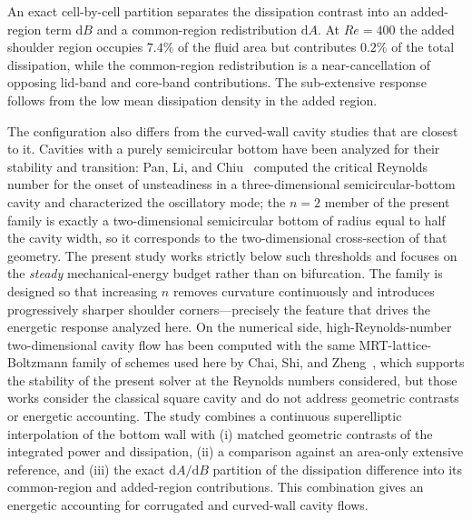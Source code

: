 An exact cell-by-cell partition separates the dissipation contrast into an added-region term $\mathrm{d}B$ and a common-region redistribution $\mathrm{d}A$. At $Re=400$ the added shoulder region occupies $7.4\%$ of the fluid area but contributes $0.2\%$ of the total dissipation, while the common-region redistribution is a near-cancellation of opposing lid-band and core-band contributions. The sub-extensive response follows from the low mean dissipation density in the added region.

The configuration also differs from the curved-wall cavity studies that are closest to it. Cavities with a purely semicircular bottom have been analyzed for their stability and transition: Pan, Li, and Chiu~\cite{Pan2025} computed the critical Reynolds number for the onset of unsteadiness in a three-dimensional semicircular-bottom cavity and characterized the oscillatory mode; the $n=2$ member of the present family is exactly a two-dimensional semicircular bottom of radius equal to half the cavity width, so it corresponds to the two-dimensional cross-section of that geometry. The present study works strictly below such thresholds and focuses on the \emph{steady} mechanical-energy budget rather than on bifurcation. The family is designed so that increasing $n$ removes curvature continuously and introduces progressively sharper shoulder corners---precisely the feature that drives the energetic response analyzed here. On the numerical side, high-Reynolds-number two-dimensional cavity flow has been computed with the same MRT-lattice-Boltzmann family of schemes used here by Chai, Shi, and Zheng~\cite{Chai2006}, which supports the stability of the present solver at the Reynolds numbers considered, but those works consider the classical square cavity and do not address geometric contrasts or energetic accounting. The study combines a continuous superelliptic interpolation of the bottom wall with (i) matched geometric contrasts of the integrated power and dissipation, (ii) a comparison against an area-only extensive reference, and (iii) the exact $\mathrm{d}A/\mathrm{d}B$ partition of the dissipation difference into its common-region and added-region contributions. This combination gives an energetic accounting for corrugated and curved-wall cavity flows.


